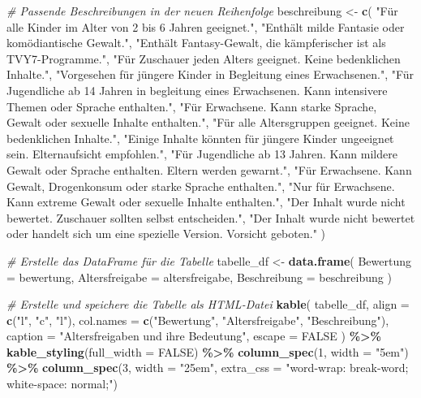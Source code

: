 \documentclass[
]{article}
\newenvironment{Shaded}{\begin{snugshade}}{\end{snugshade}}
\newcommand{\AttributeTok}[1]{\textcolor[rgb]{0.13,0.29,0.53}{#1}}
\newcommand{\CommentTok}[1]{\textcolor[rgb]{0.56,0.35,0.01}{\textit{#1}}}
\newcommand{\ConstantTok}[1]{\textcolor[rgb]{0.56,0.35,0.01}{#1}}
\newcommand{\DecValTok}[1]{\textcolor[rgb]{0.00,0.00,0.81}{#1}}
\newcommand{\FunctionTok}[1]{\textcolor[rgb]{0.13,0.29,0.53}{\textbf{#1}}}
\newcommand{\NormalTok}[1]{#1}
\newcommand{\OtherTok}[1]{\textcolor[rgb]{0.56,0.35,0.01}{#1}}
\newcommand{\SpecialCharTok}[1]{\textcolor[rgb]{0.81,0.36,0.00}{\textbf{#1}}}
\newcommand{\StringTok}[1]{\textcolor[rgb]{0.31,0.60,0.02}{#1}}
\begin{document}
\begin{Shaded}
\begin{Highlighting}[]
\CommentTok{\# Passende Beschreibungen in der neuen Reihenfolge}
\NormalTok{beschreibung }\OtherTok{\textless{}{-}} \FunctionTok{c}\NormalTok{(}
  \StringTok{"Für alle Kinder im Alter von 2 bis 6 Jahren geeignet."}\NormalTok{,}
  \StringTok{"Enthält milde Fantasie oder komödiantische Gewalt."}\NormalTok{,}
  \StringTok{"Enthält Fantasy{-}Gewalt, die kämpferischer ist als TVY7{-}Programme."}\NormalTok{,}
  \StringTok{"Für Zuschauer jeden Alters geeignet. Keine bedenklichen Inhalte."}\NormalTok{,}
  \StringTok{"Vorgesehen für jüngere Kinder in Begleitung eines Erwachsenen."}\NormalTok{,}
  \StringTok{"Für Jugendliche ab 14 Jahren in begleitung eines Erwachsenen. Kann intensivere Themen oder Sprache enthalten."}\NormalTok{,}
  \StringTok{"Für Erwachsene. Kann starke Sprache, Gewalt oder sexuelle Inhalte enthalten."}\NormalTok{,}
  \StringTok{"Für alle Altersgruppen geeignet. Keine bedenklichen Inhalte."}\NormalTok{,}
  \StringTok{"Einige Inhalte könnten für jüngere Kinder ungeeignet sein. Elternaufsicht empfohlen."}\NormalTok{,}
  \StringTok{"Für Jugendliche ab 13 Jahren. Kann mildere Gewalt oder Sprache enthalten. Eltern werden gewarnt."}\NormalTok{,}
  \StringTok{"Für Erwachsene. Kann Gewalt, Drogenkonsum oder starke Sprache enthalten."}\NormalTok{,}
  \StringTok{"Nur für Erwachsene. Kann extreme Gewalt oder sexuelle Inhalte enthalten."}\NormalTok{,}
  \StringTok{"Der Inhalt wurde nicht bewertet. Zuschauer sollten selbst entscheiden."}\NormalTok{,}
  \StringTok{"Der Inhalt wurde nicht bewertet oder handelt sich um eine spezielle Version. Vorsicht geboten."}
\NormalTok{)}


\CommentTok{\# Erstelle das DataFrame für die Tabelle}
\NormalTok{tabelle\_df }\OtherTok{\textless{}{-}} \FunctionTok{data.frame}\NormalTok{(}
  \AttributeTok{Bewertung =}\NormalTok{ bewertung,}
  \AttributeTok{Altersfreigabe =}\NormalTok{ altersfreigabe,}
  \AttributeTok{Beschreibung =}\NormalTok{ beschreibung}
\NormalTok{)}

\CommentTok{\# Erstelle und speichere die Tabelle als HTML{-}Datei}
\FunctionTok{kable}\NormalTok{(}
\NormalTok{  tabelle\_df,}
  \AttributeTok{align =} \FunctionTok{c}\NormalTok{(}\StringTok{"l"}\NormalTok{, }\StringTok{"c"}\NormalTok{, }\StringTok{"l"}\NormalTok{),}
  \AttributeTok{col.names =} \FunctionTok{c}\NormalTok{(}\StringTok{"Bewertung"}\NormalTok{, }\StringTok{"Altersfreigabe"}\NormalTok{, }\StringTok{"Beschreibung"}\NormalTok{),}
  \AttributeTok{caption =} \StringTok{"Altersfreigaben und ihre Bedeutung"}\NormalTok{,}
  \AttributeTok{escape =} \ConstantTok{FALSE}
\NormalTok{) }\SpecialCharTok{\%\textgreater{}\%}
  \FunctionTok{kable\_styling}\NormalTok{(}\AttributeTok{full\_width =} \ConstantTok{FALSE}\NormalTok{) }\SpecialCharTok{\%\textgreater{}\%}
  \FunctionTok{column\_spec}\NormalTok{(}\DecValTok{1}\NormalTok{, }\AttributeTok{width =} \StringTok{"5em"}\NormalTok{) }\SpecialCharTok{\%\textgreater{}\%}
  \FunctionTok{column\_spec}\NormalTok{(}\DecValTok{3}\NormalTok{, }\AttributeTok{width =} \StringTok{"25em"}\NormalTok{, }\AttributeTok{extra\_css =} \StringTok{"word{-}wrap: break{-}word; white{-}space: normal;"}\NormalTok{)}
\end{Highlighting}
\end{Shaded}
\end{document}
